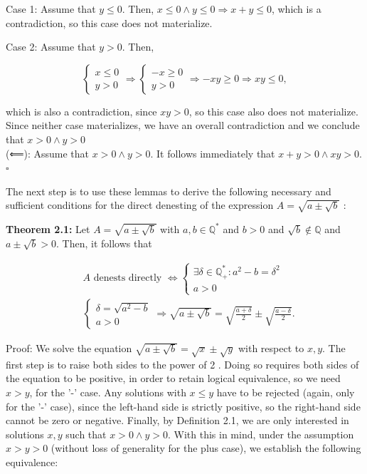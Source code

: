 \documentclass[11pt,letterpaper]{article}
\begin{document}
Case 1: Assume that $y \leq 0$. Then, $x \leq 0 \wedge y\leq0\Longrightarrow x+y\leq0$, which is a contradiction, so this case does not materialize.

Case 2: Assume that $y>0$. Then,

\[
\left\{\begin{array} { l } 
{ x \leq 0 } \\
{ y > 0 }
\end{array} \Longrightarrow \left\{\begin{array}{l}
-x \geq 0 \\
y>0
\end{array} \Longrightarrow-x y \geq 0 \Longrightarrow x y \leq 0,\right.\right.
\]

which is also a contradiction, since $x y>0$, so this case also does not materialize.\\
Since neither case materializes, we have an overall contradiction and we conclude that $x>0 \wedge y>0$\\
(⟸): Assume that $x>0 \wedge y>0$. It follows immediately that $x+y>0 \wedge x y>0$. \(\square\)

The next step is to use these lemmas to derive the following necessary and sufficient conditions for the direct denesting of the expression $A=\sqrt{a \pm \sqrt{b}}$ :

\noindent\textbf{Theorem 2.1:} Let $A=\sqrt{a \pm \sqrt{b}}$ with $a, b \in \mathbb{Q}^{*}$ and $b>0$ and $\sqrt{b} \notin \mathbb{Q}$ and $a \pm \sqrt{b}>0$. Then, it follows that


\begin{align*}
& A \text { denests directly } \Longleftrightarrow\left\{\begin{array}{l}
\exists \delta \in \mathbb{Q}_{+}^{*}: a^{2}-b=\delta^{2} \\
a>0
\end{array}\right. \\
& \left\{\begin{array}{l}
\delta=\sqrt{a^{2}-b} \\
a>0
\end{array} \Longrightarrow \sqrt{a \pm \sqrt{b}}=\sqrt{\frac{a+\delta}{2}} \pm \sqrt{\frac{a-\delta}{2}} .\right. \tag{4}\label{eq:4}
\end{align*}


Proof: We solve the equation $\sqrt{a \pm \sqrt{b}}=\sqrt{x} \pm \sqrt{y}$ with respect to $x, y$. The first step is to raise both sides to the power of 2 . Doing so requires both sides of the equation to be positive, in order to retain logical equivalence, so we need $x>y$, for the '-' case. Any solutions with $x \leq y$ have to be rejected (again, only for the '-' case), since the left-hand side is strictly positive, so the right-hand side cannot be zero or negative. Finally, by Definition 2.1, we are only interested in solutions $x, y$ such that $x>0 \wedge y>0$. With this in mind, under the assumption $x>y>0$ (without loss of generality for the plus case), we establish the following equivalence:
\end{document}
